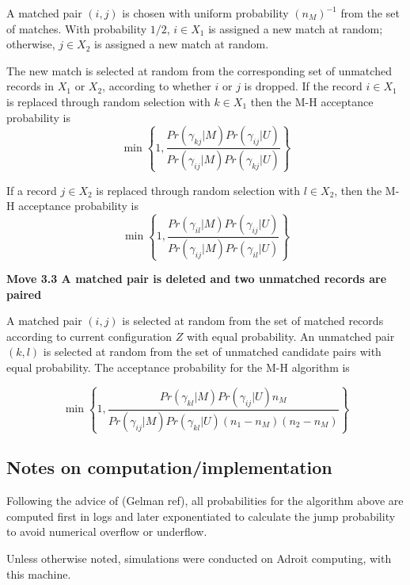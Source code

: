 \documentclass[11pt,reqno]{amsart}
\begin{document}
A matched pair $(i,j)$ is chosen with uniform probability $(n_M)^{-1}$ from the set of matches.  With probability $1/2$, $i\in X_1$ is assigned a new match at random; otherwise, $j\in X_2$ is assigned a new match at random.

The new match is selected at random from the corresponding set of unmatched records in $X_1$ or $X_2$, according to whether $i$ or $j$ is dropped.   If the record $i \in X_1$ is replaced through random selection with $k \in X_1$ then the M-H acceptance probability is
\[ \min \left\{ 1, \frac{Pr(\gamma_{kj} | M) Pr(\gamma_{ij} | U)}{Pr(\gamma_{ij}| M) Pr(\gamma_{kj} | U)} \right\} \]

If a record $j\in X_2$ is replaced through random selection with $l \in X_2$, then the M-H acceptance probability is 
\[ \min \left\{1, \frac{Pr(\gamma_{il} | M) Pr(\gamma_{ij} | U)}{Pr(\gamma_{ij} | M) Pr(\gamma_{il} | U)} \right\} \]

\textbf{Move 3.3 A matched pair is deleted and two unmatched records are paired}

A matched pair $(i,j)$ is selected at random from the set of matched records according to current configuration $Z$ with equal probability.  An unmatched pair $(k,l)$ is selected at random from the set of unmatched candidate pairs with equal probability.   The acceptance probability for the M-H algorithm is

\[ \min \left\{1,  \frac{Pr(\gamma_{kl} | M)Pr(\gamma_{ij} | U) n_M}{Pr(\gamma_{ij} | M) Pr(\gamma_{kl} | U) (n_1 - n_M)(n_2 - n_M)} \right\} \]

\subsection{Notes on computation/implementation}

Following the advice of (Gelman ref), all probabilities for the algorithm above are computed first in logs and later exponentiated to calculate the jump probability to avoid numerical overflow or underflow. 

Unless otherwise noted, simulations were conducted on Adroit computing, with this machine.  
\end{document}
